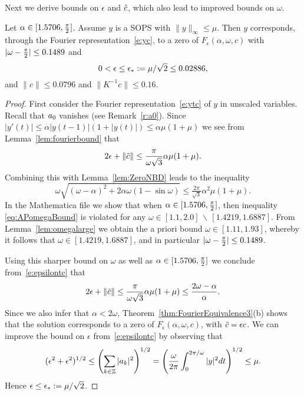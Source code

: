 Next we derive bounds on $\epsilon$ and $\tilde{c}$, which also lead to improved bounds on $\omega$.
\begin{lemma}\label{lem:wrightbounds}
Let $\alpha \in [1.5706,\tfrac{\pi}{2}]$. Assume $y$ is a SOPS with $\| y \|_\infty \leq \mu$.
Then $y$ corresponds, through the Fourier representation~\eqref{e:yc}, to a zero of $F_\epsilon(\alpha,\omega,c)$ with $|\omega- \tfrac{\pi}{2}| \leq 0.1489$ and
\[
  0< \epsilon \leq \epsilon_* := \mu/\sqrt{2} \leq 0.02886 ,
\] 
and 
$\| c \| \leq 0.0796$ 
and 
$\| K^{-1} c \| \leq  0.16 $.
\end{lemma}
\begin{proof}
First consider the Fourier representation~\eqref{e:ytc} of $y$ in unscaled variables. 
Recall that $a_0$ vanishes (see Remark~\ref{r:a0}).
Since $|y'(t)| \leq \alpha |y(t-1)| (1+|y(t)|) \leq \alpha \mu (1+\mu)$
we see from  Lemma~\ref{lem:fourierbound} that 
\begin{equation}\label{e:epsilontc} 
  2 \epsilon + \| \tilde{c} \|  \leq \frac{\pi}{\omega\sqrt{3}} \alpha \mu (1+\mu).
\end{equation}
Combining this with Lemma~\ref{lem:ZeroNBD} leads to the inequality
\begin{equation}
\label{eq:APomegaBound}
	\omega 	\sqrt{(\omega- \alpha)^2 + 2 \alpha \omega ( 1- \sin \omega)} 
	\leq 
	\tfrac{2 \pi}{ \sqrt{3}}  \alpha^2 \mu ( 1 + \mu).
\end{equation}
In the Mathematica file \cite{mathematicafile} we show that when $ \alpha \in [ 1.5706,\tfrac{\pi}{2}]$, then inequality \eqref{eq:APomegaBound} is violated for any $\omega \in [ 1.1,2.0] \, \backslash \, [1.4219, 1.6887]$.
From Lemma~\ref{lem:omegalarge} we obtain the a priori  bound
$\omega \in [1.11,1.93]$, whereby it follows that  $\omega \in [1.4219,1.6887]$, and in particular  $|\omega - \tfrac{\pi}{2}| \leq 0.1489$. 


Using this sharper bound on $\omega$ as well as $\alpha \in [1.5706,\tfrac{\pi}{2}]$
we conclude from~\eqref{e:epsilontc} that
\begin{equation}
	2 \epsilon + \| \tilde{c} \|  \leq \frac{\pi}{\omega\sqrt{3}} \alpha \mu (1+\mu)
	\leq \frac{2\omega - \alpha}{\alpha}.
\end{equation} 
Since we also infer that $\alpha < 2\omega$,  Theorem~\ref{thm:FourierEquivalence3}(b) shows that the solution corresponds to a zero of $F_\epsilon(\alpha,\omega,c)$, with $\tilde{c} = \epsilon c $.
We can improve the bound on $\epsilon$ from~\eqref{e:epsilontc}
by observing that
\[
	( \epsilon^2 + \epsilon^2)^{1/2} 
	\leq \left( \sum_{k\in\mathbb{Z}} |a_k|^2 \right)^{1/2}
	 =  \left( \frac{\omega}{2\pi} \int_0^{2\pi/\omega}
	                         |y|^2 dt  \right)^{1/2} \leq \mu .
\]
Hence $\epsilon \leq \epsilon_* := \mu/\sqrt{2}$.


\end{proof}
